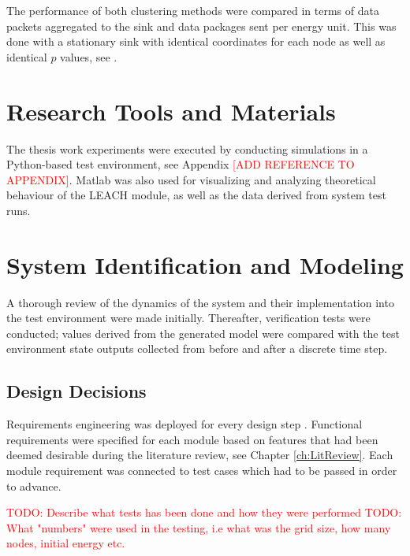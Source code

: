\noindent The performance of both clustering methods were compared in terms of data packets aggregated to the sink and data packages sent per energy unit. This was done with a stationary sink with identical coordinates for each node as well as identical $p$ values, see \cite{heinzelman2000energy}.\newline

\section{Research Tools and Materials}
The thesis work experiments were executed by conducting simulations in a Python-based test environment, see Appendix \textcolor{red}{[ADD REFERENCE TO APPENDIX]}. Matlab was also used for visualizing and analyzing theoretical behaviour of the LEACH module, as well as the data derived from system test runs.

\section{System Identification and Modeling}
A thorough review of the dynamics of the system and their implementation into the test environment were made initially. Thereafter, verification tests were conducted; values derived from the generated model were compared with the test environment state outputs collected from before and after a discrete time step.

\subsection{Design Decisions}
Requirements engineering was deployed for every design step \cite{6146379}. Functional requirements were specified for each module based on features that had been deemed desirable during the literature review, see Chapter \ref{ch:LitReview}. Each module requirement was connected to test cases which had to be passed in order to advance.


\noindent \textcolor{red}{TODO: Describe what tests has been done and how they were performed} \newline
\textcolor{red}{TODO: What "numbers" were used in the testing, i.e what was the grid size, how many nodes, initial energy etc.}



